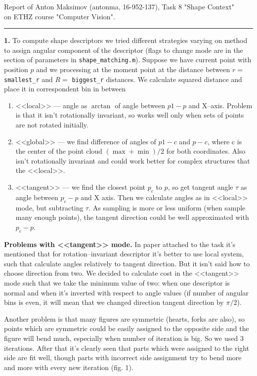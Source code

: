 \documentclass{report}
\begin{document}
\large
Report of Anton Maksimov (antonma, 16-952-137), Task 8 "Shape Context"\\
 on ETHZ course "Computer Vision".\\
\rule{\linewidth}{1pt}
	\textbf{1.} To compute shape descriptors we tried different strategies varying on method to assign angular component of the descriptor (flags to change mode are in the section of parameters in \texttt{shape\_matching.m}).  Suppose we have current point with position $p$ and we processing at the moment point at the distance between $r = $ \texttt{smallest\_r} and $R = $ \texttt{biggest\_r} distances. We calculate squared distance and place it in correspondent bin in between 
	\begin{enumerate}
		\item <<local>> --- angle as $\arctan$ of angle between $p1-p$ and X--axis. Problem is that it isn't rotationally invariant, so works well only when sets of points are not rotated initially.
		\item <<global>> --- we find difference of angles of $p1-c$ and $p-c$, where c is the center of the point cloud $(\max + \min)/2$ for both coordinates. Also isn't rotationally invariant and could work better for complex structures that the <<local>>.
		\item <<tangent>> --- we find the closest point $p_c$ to $p$, so get tangent angle $\tau$ as angle between $p_c-p$ and X axis. Then we calculate angles as in <<local>> mode, but subtracting $\tau$. As sampling is more or less uniform (when sample many enough points), the tangent direction could be well approximated with $p_c-p$.
	\end{enumerate}
\textbf{Problems with <<tangent>> mode.}
In paper attached to the task it's mentioned that for rotation--invariant descriptor it's better to use local system, such that calculate angles relatively to tangent direction. But it isn't said how to choose direction from two. We decided to calculate cost in the <<tangent>> mode such that we take the minimum value of two: when one descriptor is normal and when it's inverted with respect to angle values (if number of angular bins is even, it will mean that we changed direction tangent direction by $\pi/2$).


Another problem is that many figures are symmetric (hearts, forks are also), so points which are symmetric could be easily assigned to the opposite side and the figure will bend much, especially when number of iteration is big. So we used 3 iterations. After that it's clearly seen that parts which were assigned to the right side are fit well, though parts with incorrect side assignment try to bend more and more with every new iteration (fig. 1).
\end{document}
